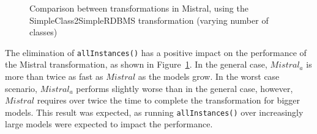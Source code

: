 \documentclass[12pt]{elsarticle}
\begin{document}
\begin{figure}[thb]
\centering
{}
\caption{Comparison between transformations in Mistral, using the
SimpleClass2SimpleRDBMS transformation (varying number of
classes)\label{fig:mistral_attributes_compared}}
\end{figure}

The elimination of \texttt{allInstances()} has a positive impact on the performance of
the Mistral transformation, as shown in
Figure~\ref{fig:mistral_attributes_compared}. In the general case, $Mistral_a$
is more than twice as fast as $Mistral$ as the models grow. In the worst case
scenario, $Mistral_a$ performs slightly worse than in the general case, however, $Mistral$ requires
over twice the time to complete the transformation for bigger models. This
result was expected, as running \texttt{allInstances()} over increasingly large models
were expected to impact the performance.
\end{document}
